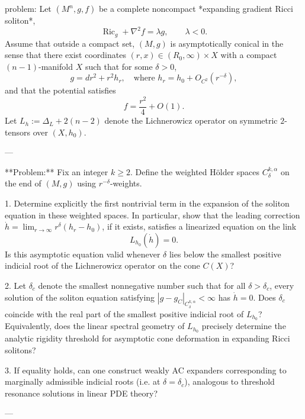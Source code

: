 problem:  
Let \((M^n,g,f)\) be a complete noncompact *expanding gradient Ricci soliton*,
\[
\operatorname{Ric}_g + \nabla^2 f = \lambda g, \qquad \lambda < 0.
\]
Assume that outside a compact set, \((M,g)\) is asymptotically conical in the sense that there exist coordinates \((r,x)\in(R_0,\infty)\times X\) with a compact \((n-1)\)-manifold \(X\) such that for some \(\delta>0\),
\[
g = dr^2 + r^2 h_r, \quad \text{where } h_r = h_0 + O_{C^2}(r^{-\delta}),
\]
and that the potential satisfies
\[
f = \frac{r^2}{4} + O(1).
\]
Let \(L_h := \Delta_L + 2(n-2)\) denote the Lichnerowicz operator on symmetric \(2\)-tensors over \((X,h_0)\).

---

**Problem:**  
Fix an integer \(k\ge2\). Define the weighted Hölder spaces \(C^{k,\alpha}_\delta\) on the end of \((M,g)\) using \(r^{-\delta}\)-weights.  

1. Determine explicitly the first nontrivial term in the expansion of the soliton equation in these weighted spaces.  
   In particular, show that the leading correction \(\dot h = \lim_{r\to\infty} r^{\delta}(h_r - h_0)\), if it exists, satisfies a linearized equation on the link
   \[
   L_{h_0}(\dot{h}) = 0.
   \]
   Is this asymptotic equation valid whenever \(\delta\) lies below the smallest positive indicial root of the Lichnerowicz operator on the cone \(C(X)\)?

2. Let \(\delta_c\) denote the smallest nonnegative number such that for all \(\delta > \delta_c\), every solution of the soliton equation satisfying \(|g - g_C|_{C^{k,\alpha}_\delta}<\infty\) has \(\dot{h}=0\).  
   Does \(\delta_c\) coincide with the real part of the smallest positive indicial root of \(L_{h_0}\)?  
   Equivalently, does the linear spectral geometry of \(L_{h_0}\) precisely determine the analytic rigidity threshold for asymptotic cone deformation in expanding Ricci solitons?

3. If equality holds, can one construct weakly AC expanders corresponding to marginally admissible indicial roots (i.e. at \(\delta=\delta_c\)), analogous to threshold resonance solutions in linear PDE theory?

---

